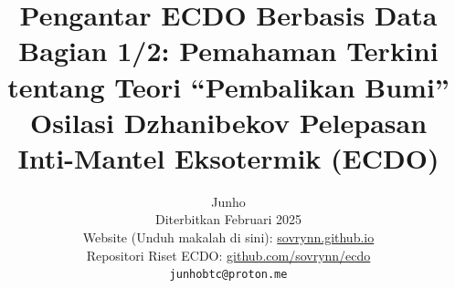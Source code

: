 \documentclass[10pt,twocolumn,letterpaper]{article}
\begin{document}
\title{Pengantar ECDO Berbasis Data Bagian 1/2: Pemahaman Terkini tentang Teori “Pembalikan Bumi” Osilasi Dzhanibekov Pelepasan Inti-Mantel Eksotermik (ECDO)}

\author{Junho\\
Diterbitkan Februari 2025\\
Website (Unduh makalah di sini): \href{https://sovrynn.github.io}{sovrynn.github.io}\\
Repositori Riset ECDO: \href{https://github.com/sovrynn/ecdo}{github.com/sovrynn/ecdo}\\
{\tt\small junhobtc@proton.me}
}

\maketitle
\end{document}
